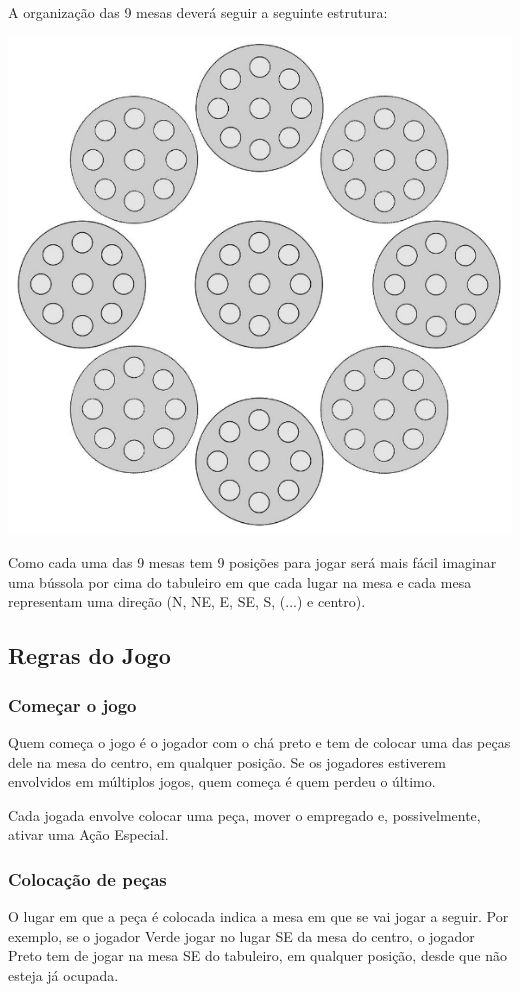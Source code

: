 \documentclass[a4paper]{article}
\begin{document}
A organização das 9 mesas deverá seguir a seguinte estrutura: \newline
\begin{center}
\includegraphics[scale=0.5]{board-setup.png}\newline
\end{center}

Como cada uma das 9 mesas tem 9 posições para jogar será mais fácil imaginar uma bússola por cima do tabuleiro em que cada lugar na mesa e cada mesa representam uma direção (N, NE, E, SE, S, (...) e centro). 

\subsection{Regras do Jogo}
\subsubsection{Começar o jogo}
Quem começa o jogo é o jogador com o chá preto e tem de colocar uma das peças dele na mesa do centro, em qualquer posição. Se os jogadores estiverem envolvidos em múltiplos jogos, quem começa é quem perdeu o último. 

Cada jogada envolve colocar uma peça, mover o empregado e, possivelmente, ativar uma Ação Especial.

\subsubsection{Colocação de peças}
O lugar em que a peça é colocada indica a mesa em que se vai jogar a seguir. Por exemplo, se o jogador Verde jogar no lugar SE da mesa do centro, o jogador Preto tem de jogar na mesa SE do tabuleiro, em qualquer posição, desde que não esteja já ocupada.
\end{document}
